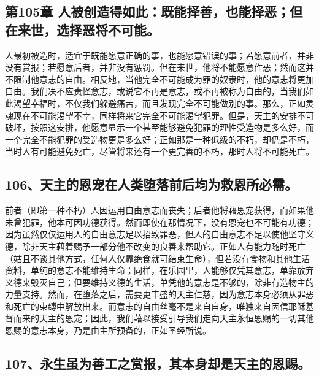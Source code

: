 
\subsection{第105章 人被创造得如此：既能择善，也能择恶；但在来世，选择恶将不可能。}

人最初被造时，适宜于既能愿意正确的事，也能愿意错误的事；若愿意前者，并非没有赏报；若愿意后者，并非没有惩罚。但在来世，他将不能愿意作恶；然而这并不限制他意志的自由。相反地，当他完全不可能成为罪的奴隶时，他的意志将更加自由。我们决不应责怪意志，或说它不再是意志，或不再被称为自由的，当我们如此渴望幸福时，不仅我们躲避痛苦，而且发现完全不可能做别的事。那么，正如灵魂现在不可能渴望不幸，同样将来它完全不可能渴望犯罪。但是，天主的安排不可破坏，按照这安排，他愿意显示一个甚至能够避免犯罪的理性受造物是多么好，而一个完全不能犯罪的受造物更是多么好；正如那是一种低级的不朽，却仍是不朽，当时人有可能避免死亡，尽管将来还有一个更完善的不朽，那时人将不可能死亡。\par


\subsection{106、天主的恩宠在人类堕落前后均为救恩所必需。}

前者（即第一种不朽）人因运用自由意志而丧失；后者他将藉恩宠获得，而如果他未曾犯罪，他本可因功德获得。然而即使在那情况下，没有恩宠也不可能有功德；因为虽然仅仅运用人的自由意志足以招致罪恶，但人的自由意志不足以使他坚守义德，除非天主藉着赐予一部分他不改变的良善来帮助它。正如人有能力随时死亡（姑且不谈其他方式，任何人仅靠绝食就可结束生命），但若没有食物和其他生活资料，单纯的意志不能维持生命；同样，在乐园里，人能够仅凭其意志，单靠放弃义德来毁灭自己；但要维持义德的生活，单凭他的意志是不够的，除非有造物主的力量支持。然而，在堕落之后，需要更丰盛的天主仁慈，因为意志本身必须从罪恶和死亡的束缚中解放出来。而意志的自由丝毫不是来自自身，唯独来自因信耶稣基督而来的天主的恩宠；因此，我们藉以接受引导我们走向天主永恒恩赐的一切其他恩赐的意志本身，乃是由主所预备的，正如圣经所说。\par


\subsection{107、永生虽为善工之赏报，其本身却是天主的恩赐。}

